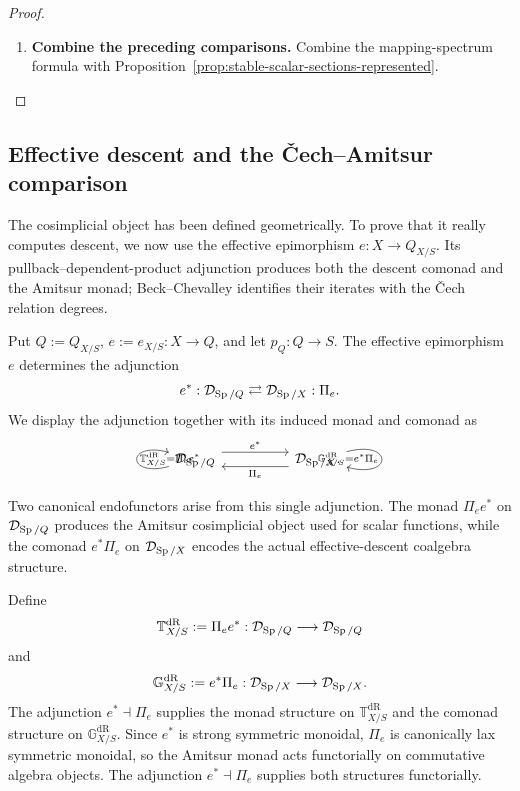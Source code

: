 \begin{proof}
\leavevmode
\begin{enumerate}[label=\textup{(\arabic*)}]
    \item \textbf{Combine the preceding comparisons.}
    Combine the mapping-spectrum formula with
    Proposition~\ref{prop:stable-scalar-sections-represented}.
\end{enumerate}
\end{proof}

\subsection{Effective descent and the \v{C}ech--Amitsur comparison}
\label{sec:infinitesimal-descent-monad}

The cosimplicial object has been defined geometrically. To prove that it
really computes descent, we now use the effective epimorphism
\(e:X\to Q_{X/S}\). Its pullback--dependent-product adjunction produces both
the descent comonad and the Amitsur monad; Beck--Chevalley identifies their
iterates with the \v{C}ech relation degrees.

Put \(Q:=Q_{X/S}\), \(e:=e_{X/S}:X\to Q\), and let
\(p_Q:Q\to S\). The effective epimorphism \(e\) determines the adjunction
\[
  e^*:\mathcal D_{\operatorname{Sp}/Q}
  \rightleftarrows
  \mathcal D_{\operatorname{Sp}/X}:\Pi_e.
\]
We display the adjunction together with its induced monad and comonad as
\[
\begin{tikzcd}[column sep=huge,row sep=large]
  \mathcal D_{\Sp/Q}
    \arrow[r,shift left=1.2ex,"e^*"]
    \arrow[loop left,"\mathbb T^{\mathrm{dR}}_{X/S}=\Pi_e e^*"']
  &
  \mathcal D_{\Sp/X}
    \arrow[l,shift left=1.2ex,"\Pi_e"]
    \arrow[loop right, swap, "\mathbb G^{\mathrm{dR}}_{X/S}=e^*\Pi_e"].
\end{tikzcd}
\]

Two canonical endofunctors arise from this single adjunction. The monad
\(\Pi_e e^*\) on \(\mathcal D_{\operatorname{Sp}/Q}\) produces the Amitsur cosimplicial object used
for scalar functions, while the comonad \(e^*\Pi_e\) on \(\mathcal D_{\operatorname{Sp}/X}\)
encodes the actual effective-descent coalgebra structure.

\begin{definition}
\label{def:de-Rham-amitsur-monad}
Define
\[
  \mathbb T^{\mathrm{dR}}_{X/S}
  :=
  \Pi_e e^*:
  \mathcal D_{\operatorname{Sp}/Q}\longrightarrow\mathcal D_{\operatorname{Sp}/Q}
\]
and
\[
  \mathbb G^{\mathrm{dR}}_{X/S}
  :=
  e^*\Pi_e:
  \mathcal D_{\operatorname{Sp}/X}\longrightarrow\mathcal D_{\operatorname{Sp}/X}.
\]
The adjunction \(e^*\dashv\Pi_e\) supplies the monad structure on
\(\mathbb T^{\mathrm{dR}}_{X/S}\) and the comonad structure on
\(\mathbb G^{\mathrm{dR}}_{X/S}\). Since \(e^*\) is strong symmetric
monoidal, \(\Pi_e\) is canonically lax symmetric monoidal, so the Amitsur monad
acts functorially on commutative algebra objects. The adjunction
\(e^*\dashv\Pi_e\) supplies both structures functorially.
\end{definition}

